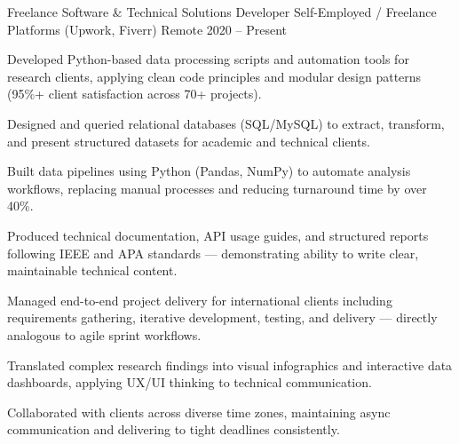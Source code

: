 

\begin{cventries}

  \cventry
    {Freelance Software \& Technical Solutions Developer} %
    {Self-Employed / Freelance Platforms (Upwork, Fiverr)} %
    {Remote} %
    {2020 -- Present} %
    {
      \begin{cvitems}
        \item {Developed Python-based data processing scripts and automation tools for research clients, applying clean code principles and modular design patterns (95\%+ client satisfaction across 70+ projects).}
        \item {Designed and queried relational databases (SQL/MySQL) to extract, transform, and present structured datasets for academic and technical clients.}
        \item {Built data pipelines using Python (Pandas, NumPy) to automate analysis workflows, replacing manual processes and reducing turnaround time by over 40\%.}
        \item {Produced technical documentation, API usage guides, and structured reports following IEEE and APA standards — demonstrating ability to write clear, maintainable technical content.}
        \item {Managed end-to-end project delivery for international clients including requirements gathering, iterative development, testing, and delivery — directly analogous to agile sprint workflows.}
        \item {Translated complex research findings into visual infographics and interactive data dashboards, applying UX/UI thinking to technical communication.}
        \item {Collaborated with clients across diverse time zones, maintaining async communication and delivering to tight deadlines consistently.}
      \end{cvitems}
    }

\end{cventries}
